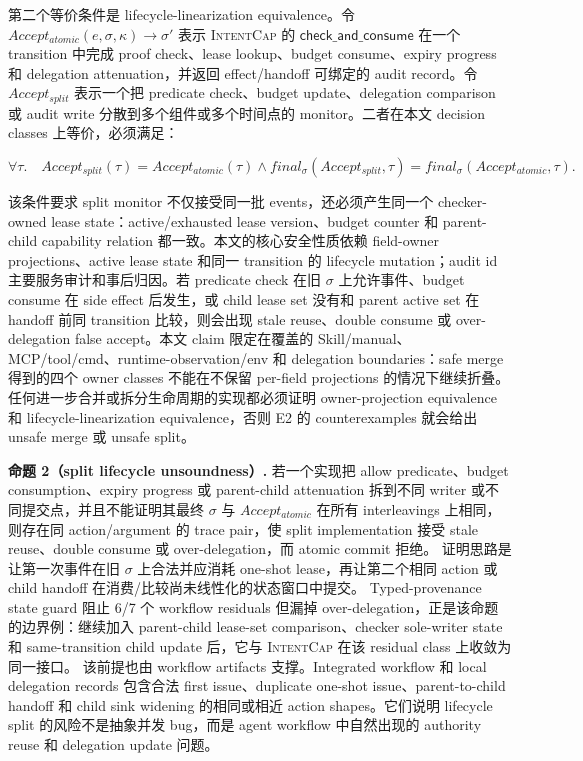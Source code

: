 \documentclass[UTF8,a4paper,11pt]{ctexart}
\newcommand{\sys}{\textsc{IntentCap}\xspace}
\begin{document}
第二个等价条件是 lifecycle-linearization equivalence。令 \(Accept_{atomic}(e,\sigma,\kappa)\rightarrow\sigma'\) 表示 \sys 的 \(\mathsf{check\_and\_consume}\) 在一个 transition 中完成 proof check、lease lookup、budget consume、expiry progress 和 delegation attenuation，并返回 effect/handoff 可绑定的 audit record。令 \(Accept_{split}\) 表示一个把 predicate check、budget update、delegation comparison 或 audit write 分散到多个组件或多个时间点的 monitor。二者在本文 decision classes 上等价，必须满足：

\[
\forall \tau.\quad
Accept_{split}(\tau)=Accept_{atomic}(\tau)
\land final_\sigma(Accept_{split},\tau)=final_\sigma(Accept_{atomic},\tau).
\]

该条件要求 split monitor 不仅接受同一批 events，还必须产生同一个 checker-owned lease state：active/exhausted lease version、budget counter 和 parent-child capability relation 都一致。本文的核心安全性质依赖 field-owner projections、active lease state 和同一 transition 的 lifecycle mutation；audit id 主要服务审计和事后归因。若 predicate check 在旧 \(\sigma\) 上允许事件、budget consume 在 side effect 后发生，或 child lease set 没有和 parent active set 在 handoff 前同 transition 比较，则会出现 stale reuse、double consume 或 over-delegation false accept。本文 claim 限定在覆盖的 Skill/manual、MCP/tool/cmd、runtime-observation/env 和 delegation boundaries：safe merge 得到的四个 owner classes 不能在不保留 per-field projections 的情况下继续折叠。任何进一步合并或拆分生命周期的实现都必须证明 owner-projection equivalence 和 lifecycle-linearization equivalence，否则 E2 的 counterexamples 就会给出 unsafe merge 或 unsafe split。

\textbf{命题 2（split lifecycle unsoundness）.}
若一个实现把 allow predicate、budget consumption、expiry progress 或 parent-child attenuation 拆到不同 writer 或不同提交点，并且不能证明其最终 \(\sigma\) 与 \(Accept_{atomic}\) 在所有 interleavings 上相同，则存在同 action/argument 的 trace pair，使 split implementation 接受 stale reuse、double consume 或 over-delegation，而 atomic commit 拒绝。
证明思路是让第一次事件在旧 \(\sigma\) 上合法并应消耗 one-shot lease，再让第二个相同 action 或 child handoff 在消费/比较尚未线性化的状态窗口中提交。
Typed-provenance state guard 阻止 6/7 个 workflow residuals 但漏掉 over-delegation，正是该命题的边界例：继续加入 parent-child lease-set comparison、checker sole-writer state 和 same-transition child update 后，它与 \sys 在该 residual class 上收敛为同一接口。
该前提也由 workflow artifacts 支撑。Integrated workflow 和 local delegation records 包含合法 first issue、duplicate one-shot issue、parent-to-child handoff 和 child sink widening 的相同或相近 action shapes。它们说明 lifecycle split 的风险不是抽象并发 bug，而是 agent workflow 中自然出现的 authority reuse 和 delegation update 问题。
\end{document}
